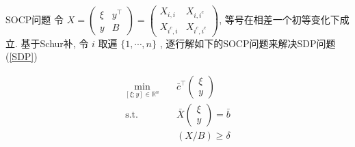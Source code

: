 \documentclass[slidestop,compress,mathserif,UTF8]{beamer}
\numberwithin{equation}{section}                                %
\begin{document}
            \begin{frame}[t]{SOCP问题}
                令
                $
                        X
                    =	\begin{pmatrix}
                            \xi & y^\top \\
                            y & B
                        \end{pmatrix}
                    =	\begin{pmatrix}
                            X_{i, i} & X_{i, i^c} \\
                            X_{i^c, i} & X_{i^c, i^c}
                        \end{pmatrix}
                $,
                等号在相差一个初等变化下成立. 基于Schur补, 令 $i$ 取遍 $\{1, \cdots, n\}$ , 逐行解如下的SOCP问题来解决SDP问题(\ref{SDP})

                \begin{equation}
                    \begin{split}\label{SOCP}
                        \min_{[\xi; y] \in \mathbb{R}^{n}} \quad
                            & \bar{c}^\top \begin{pmatrix}\xi \\ y\end{pmatrix}\\
                        \text{s.t.} \quad
                            & \bar{X} \begin{pmatrix}\xi \\ y\end{pmatrix} = \bar{b}\\
                            & (X/B) \geq \delta
                    \end{split}
                \end{equation}
            \end{frame}
\end{document}
